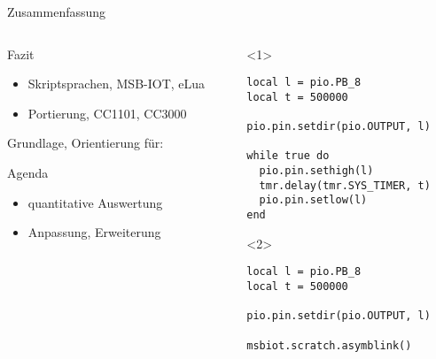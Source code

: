 \documentclass[xcolor=svgnames]{beamer}
\newcommand*{\vspplus}{\vspace{\baselineskip}}
\begin{document}
\begin{frame}[t,fragile]{Zusammenfassung}

\vspplus

\begin{columns}[T]
\begin{column}{0.47\textwidth}
\begin{block}{Fazit}
\begin{itemize}
\item Skriptsprachen, MSB-IOT, eLua
\item Portierung, CC1101, CC3000
\end{itemize}    
\end{block}

Grundlage, Orientierung für:

\begin{block}{Agenda}
\begin{itemize}
\item quantitative Auswertung
\item Anpassung, Erweiterung
\end{itemize}    
\end{block}
\end{column}

\begin{column}{0.5\textwidth}
\lstset{style=lualisting, xleftmargin=2em}
\begin{onlyenv}<1>
\begin{lstlisting}
local l = pio.PB_8
local t = 500000

pio.pin.setdir(pio.OUTPUT, l)

while true do
  pio.pin.sethigh(l)
  tmr.delay(tmr.SYS_TIMER, t)
  pio.pin.setlow(l)
end
\end{lstlisting}    
\end{onlyenv}

\begin{onlyenv}<2>
\begin{lstlisting}
local l = pio.PB_8
local t = 500000

pio.pin.setdir(pio.OUTPUT, l)

msbiot.scratch.asymblink()
\end{lstlisting}    
\end{onlyenv}
\end{column}
\end{columns}
\end{frame}

\end{document}
